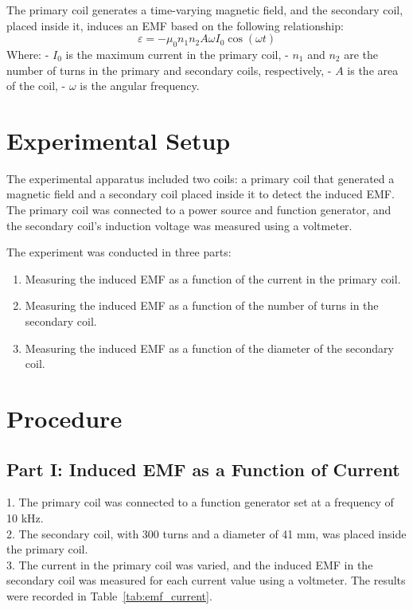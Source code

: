 \documentclass[journal]{IEEEtran}
\begin{document}
The primary coil generates a time-varying magnetic field, and the secondary coil, placed inside it, induces an EMF based on the following relationship:
\begin{equation}
    \varepsilon = - \mu_0 n_1 n_2 A \omega I_0 \cos(\omega t)
\end{equation}
Where:
- \(I_0\) is the maximum current in the primary coil,
- \(n_1\) and \(n_2\) are the number of turns in the primary and secondary coils, respectively,
- \(A\) is the area of the coil,
- \(\omega\) is the angular frequency.

\section{Experimental Setup}
The experimental apparatus included two coils: a primary coil that generated a magnetic field and a secondary coil placed inside it to detect the induced EMF. The primary coil was connected to a power source and function generator, and the secondary coil’s induction voltage was measured using a voltmeter.

The experiment was conducted in three parts:
\begin{enumerate}
    \item Measuring the induced EMF as a function of the current in the primary coil.
    \item Measuring the induced EMF as a function of the number of turns in the secondary coil.
    \item Measuring the induced EMF as a function of the diameter of the secondary coil.
\end{enumerate}

\section{Procedure}
\subsection{Part I: Induced EMF as a Function of Current}
1. The primary coil was connected to a function generator set at a frequency of 10 kHz.\\
2. The secondary coil, with 300 turns and a diameter of 41 mm, was placed inside the primary coil.\\
3. The current in the primary coil was varied, and the induced EMF in the secondary coil was measured for each current value using a voltmeter. The results were recorded in Table~\ref{tab:emf_current}.\\
\end{document}
